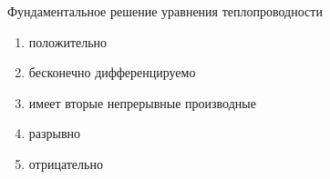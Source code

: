 Фундаментальное решение уравнения теплопроводности

\begin{enumerate}[label=\arabic*)]
    \item положительно
    \item бесконечно дифференцируемо
    \item имеет вторые непрерывные производные
    \item разрывно
    \item отрицательно
\end{enumerate}

